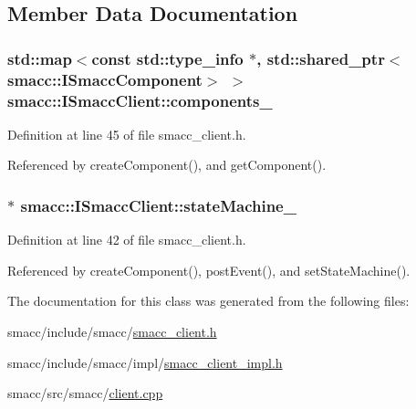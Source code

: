 \subsection{Member Data Documentation}
\subsubsection[{\texorpdfstring{components\+\_\+}{components_}}]{\setlength{\rightskip}{0pt plus 5cm}std\+::map$<$const std\+::type\+\_\+info $\ast$, std\+::shared\+\_\+ptr$<${\bf smacc\+::\+I\+Smacc\+Component}$>$ $>$ smacc\+::\+I\+Smacc\+Client\+::components\+\_\+\hspace{0.3cm}{\ttfamily [protected]}}\hypertarget{classsmacc_1_1ISmaccClient_ab983e85d296c9660f5943c1d511634ce}{}\label{classsmacc_1_1ISmaccClient_ab983e85d296c9660f5943c1d511634ce}


Definition at line 45 of file smacc\+\_\+client.\+h.



Referenced by create\+Component(), and get\+Component().

\subsubsection[{\texorpdfstring{state\+Machine\+\_\+}{stateMachine_}}]{$\ast$ smacc\+::\+I\+Smacc\+Client\+::state\+Machine\+\_\+\hspace{0.3cm}{\ttfamily [protected]}}\hypertarget{classsmacc_1_1ISmaccClient_a926e4f2ae796def63d48dca389a48c47}{}\label{classsmacc_1_1ISmaccClient_a926e4f2ae796def63d48dca389a48c47}


Definition at line 42 of file smacc\+\_\+client.\+h.



Referenced by create\+Component(), post\+Event(), and set\+State\+Machine().



The documentation for this class was generated from the following files\+:\begin{DoxyCompactItemize}
\item 
smacc/include/smacc/\hyperlink{smacc__client_8h}{smacc\+\_\+client.\+h}\item 
smacc/include/smacc/impl/\hyperlink{smacc__client__impl_8h}{smacc\+\_\+client\+\_\+impl.\+h}\item 
smacc/src/smacc/\hyperlink{client_8cpp}{client.\+cpp}\end{DoxyCompactItemize}
